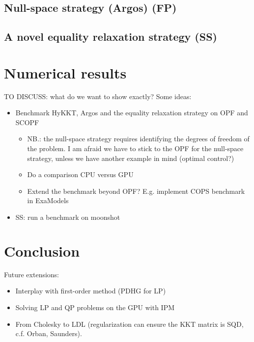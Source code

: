 \documentclass{article}
\theoremstyle{definition}
\theoremstyle{remark}
\begin{document}
\subsection{Null-space strategy (Argos) (FP)}
\subsection{A novel equality relaxation strategy (SS)}



\section{Numerical results}
TO DISCUSS: what do we want to show exactly? Some ideas:
\begin{itemize}
  \item Benchmark HyKKT, Argos and the equality relaxation strategy
    on OPF and SCOPF
    \begin{itemize}
      \item NB.: the null-space strategy requires identifying
        the degrees of freedom of the problem. I am afraid
        we have to stick to the OPF for the null-space strategy,
        unless we have another example in mind (optimal control?)
      \item Do a comparison CPU versus GPU
      \item Extend the benchmark beyond OPF? E.g. implement
        COPS benchmark in ExaModels
    \end{itemize}
\end{itemize}

\begin{itemize}
  \item SS: run a benchmark on moonshot
\end{itemize}


\section{Conclusion}
Future extensions:
\begin{itemize}
  \item Interplay with first-order method (PDHG for LP)
  \item Solving LP and QP problems on the GPU with IPM
  \item From Cholesky to LDL (regularization can
    ensure the KKT matrix is SQD, c.f. Orban, Saunders).
\end{itemize}



\end{document}
